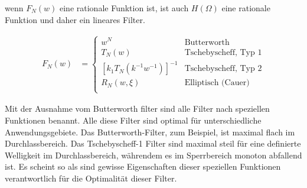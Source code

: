 wenn $F_N(w)$ eine rationale Funktion ist, ist auch $H(\Omega)$ eine rationale Funktion und daher ein lineares Filter. %

\begin{align}
    F_N(w) & =
    \begin{cases}
        w^N                            & \text{Butterworth} \\
        T_N(w)                         & \text{Tschebyscheff, Typ 1}  \\
        [k_1 T_N (k^{-1} w^{-1})]^{-1} & \text{Tschebyscheff, Typ 2}  \\
        R_N(w, \xi)                    & \text{Elliptisch (Cauer)}    \\
    \end{cases}
\end{align}

Mit der Ausnahme vom Butterworth filter sind alle Filter nach speziellen Funktionen benannt.
Alle diese Filter sind optimal für unterschiedliche Anwendungsgebiete.
Das Butterworth-Filter, zum Beispiel, ist maximal flach im Durchlassbereich.
Das Tschebyscheff-1 Filter sind maximal steil für eine definierte Welligkeit im Durchlassbereich, währendem es im Sperrbereich monoton abfallend ist.
Es scheint so als sind gewisse Eigenschaften dieser speziellen Funktionen verantwortlich für die Optimalität dieser Filter.
